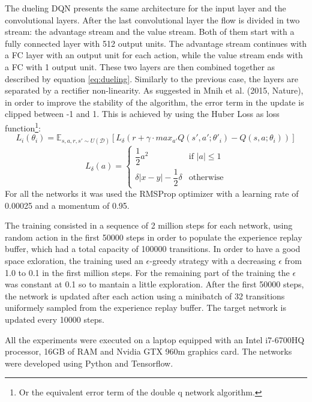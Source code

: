 \documentclass[article,11pt]{article}
\begin{document}
	The dueling DQN presents the same architecture for the input layer and the convolutional layers. After the last convolutional layer the flow is divided in two stream: the advantage stream and the value stream. Both of them start with a fully connected layer with 512 output units. The advantage stream continues with a FC layer with an output unit for each action, while the value stream ends with a FC with 1 output unit. These two layers are then combined together as described by equation \ref{eq:dueling}. Similarly to the previous case, the layers are separated by a rectifier non-linearity.
	As suggested in Mnih et al. (2015, Nature), in order to improve the stability of the algorithm,  the error term in the update is clipped between -1 and 1. This is achieved by using the Huber Loss as loss function\footnote{Or the equivalent error term of the double q network algorithm.}:
	\begin{equation}
		L_i(\theta_i) = \mathbb{E}_{s,a,r,s'\sim U(\mathcal{D})} \left[L_\delta \left( r + \gamma\cdot max_{a'}Q(s',a'; \theta'_i) - Q(s,a;\theta_i) \right) \right]
	\end{equation}
	\begin{equation}
		L_{\delta}(a)  = 
		\begin{cases}
			\dfrac{1}{2}a^2 & \text{if $|a| \leq 1$}\\
			\delta|x-y| - \dfrac{1}{2}\delta & \text{otherwise}
		\end{cases}
	\end{equation}
	For all the networks it was used the RMSProp optimizer with a learning rate of 0.00025 and a momentum of 0.95.
	
	The training consisted in a sequence of 2 million steps for each network, using random action in the first 50000 steps in order to populate the experience replay buffer, which had a total capacity of 100000 transitions. In order to have a good space exloration, the training used an $\epsilon$-greedy strategy with a decreasing $\epsilon$ from 1.0 to 0.1 in the first million steps. For the remaining part of the training the $\epsilon$ was constant at 0.1 so to mantain a little exploration. After the first 50000 steps, the network is updated after each action using a minibatch of 32 transitions uniformely sampled from the experience replay buffer. The target network is updated every 10000 steps.
	
	All the experiments were executed on a laptop equipped with an Intel i7-6700HQ processor, 16GB of RAM and Nvidia GTX 960m graphics card. The networks were developed using Python and Tensorflow.
	
\end{document}

